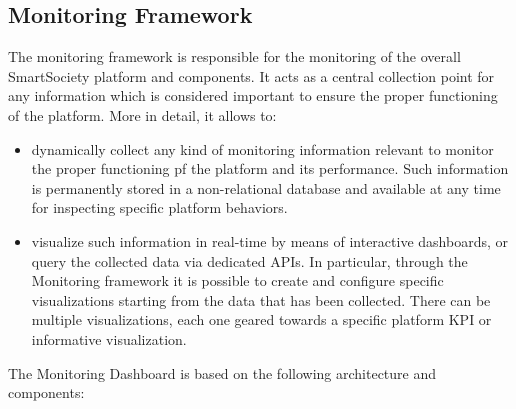 \subsection{Monitoring Framework}
The monitoring framework is responsible for the monitoring of the overall SmartSociety platform and components. It acts as a central collection point for any information which is considered important to ensure the proper functioning of the platform. More in detail, it allows to:
\begin{itemize}
\item dynamically collect any kind of monitoring information relevant to monitor the proper functioning pf the platform and its performance. Such information is permanently stored in a non-relational database and available at any time for inspecting specific platform behaviors.
\item visualize such information in real-time by means of interactive dashboards, or query the collected data via dedicated APIs. In particular, through the Monitoring framework it is possible to create and configure specific visualizations starting from the data that has been collected. There can be multiple visualizations, each one geared towards a specific platform KPI or informative visualization.
\end{itemize} 

The Monitoring Dashboard is based on the following architecture and components:


